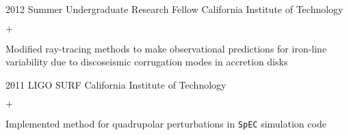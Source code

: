 \documentclass[]{luger-cv} %
\begin{document}
\begin{entrylist}
\ifdefined \onepage \else
\entry
{2012}
{Summer Undergraduate Research Fellow}
{California Institute of Technology}
{%
\vspace{-1em}
\begin{list}{$+$}{\cvlist}
\item Modified ray-tracing methods to make observational predictions for iron-line variability due to discoseismic corrugation modes in accretion disks
\end{list}
}
\fi


\ifdefined \onepage \else
\entry
{2011}
{LIGO SURF}
{California Institute of Technology}
{%
\vspace{-1em}
\begin{list}{$+$}{\cvlist}
\item Implemented method for quadrupolar perturbations in \texttt{SpEC} simulation code
\end{list}
}
\fi


\end{entrylist}

\end{document}
